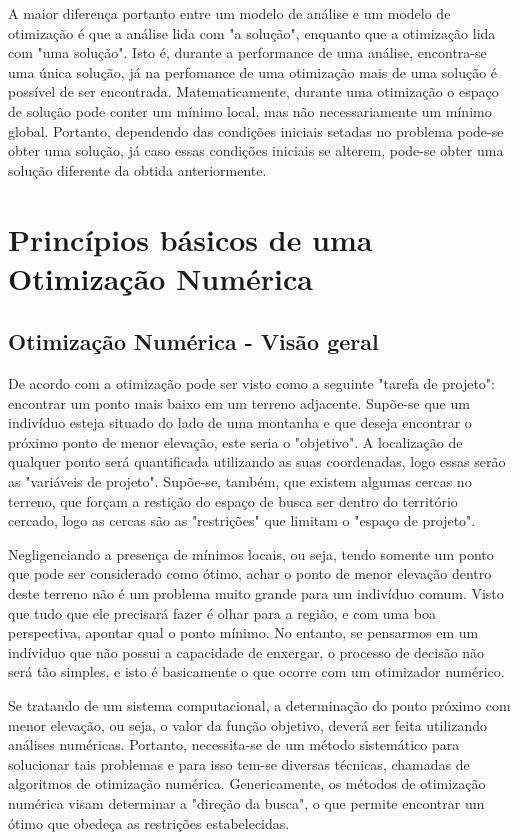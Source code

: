  A maior diferença portanto entre um modelo de análise e um modelo de otimização é que a análise lida com "a solução", enquanto que a otimização lida com "uma solução". Isto é, durante a performance de uma análise, encontra-se uma única solução, já na perfomance de uma otimização mais de uma solução é possível de ser encontrada. Matematicamente, durante uma otimização o espaço de solução pode conter um mínimo local, mas não necessariamente um mínimo global. Portanto, dependendo das condições iniciais setadas no problema pode-se obter uma solução, já caso essas condições iniciais se alterem, pode-se obter uma solução diferente da obtida anteriormente.

 \section{Princípios básicos de uma Otimização Numérica}
 \subsection{Otimização Numérica - Visão geral}
De acordo com \cite{moore1994msc} a otimização pode ser visto como a seguinte "tarefa de projeto": encontrar um ponto mais baixo em um terreno adjacente. Supõe-se que um indivíduo esteja situado do lado de uma montanha e que deseja encontrar o próximo ponto de menor elevação, este seria o "objetivo". A localização de qualquer ponto será quantificada utilizando as suas coordenadas, logo essas serão as "variáveis de projeto". Supõe-se, também, que existem algumas cercas no terreno, que forçam a restição do espaço de busca ser dentro do território cercado, logo as cercas são as "restrições" que limitam o "espaço de projeto".

Negligenciando a presença de mínimos locais, ou seja, tendo somente um ponto que pode ser considerado como ótimo, achar o ponto de menor elevação dentro deste terreno não é um problema muito grande para um indivíduo comum. Visto que tudo que ele precisará fazer é olhar para a região, e com uma boa perspectiva, apontar qual o ponto mínimo.
No entanto, se pensarmos em um indíviduo que não possui a capacidade de enxergar, o processo de decisão não será tão simples, e isto é basicamente o que ocorre com um otimizador numérico.

Se tratando de um sistema computacional, a determinação do ponto próximo com menor elevação, ou seja, o valor da função objetivo, deverá ser feita utilizando análises numéricas. Portanto, necessita-se de um método sistemático para solucionar tais problemas e para isso tem-se diversas técnicas, chamadas de algoritmos de otimização numérica. Genericamente, os métodos de otimização numérica visam determinar a "direção da busca", o que permite encontrar um ótimo que obedeça as restrições estabelecidas.

